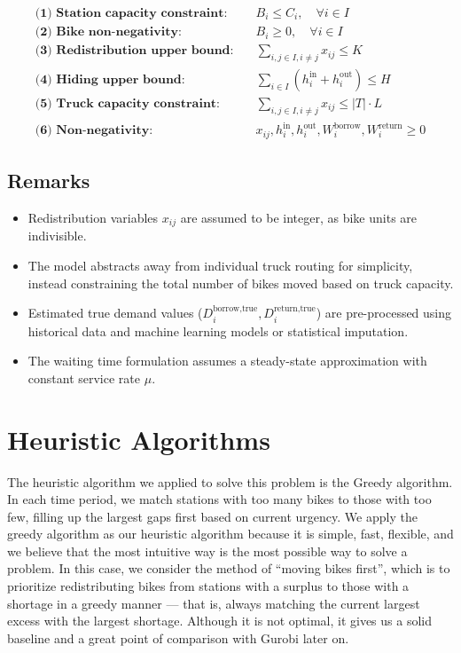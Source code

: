 \documentclass[11pt,a4paper]{article}
\begin{document}
\begin{align*}
\textbf{(1) Station capacity constraint:} & \quad B_i \leq C_i, \quad \forall i \in I \\
\textbf{(2) Bike non-negativity:} & \quad B_i \geq 0, \quad \forall i \in I \\
\textbf{(3) Redistribution upper bound:} & \quad \sum_{i,j \in I, i \ne j} x_{ij} \leq K \\
\textbf{(4) Hiding upper bound:} & \quad \sum_{i \in I} \left(h_i^{\text{in}} + h_i^{\text{out}}\right) \leq H \\
\textbf{(5) Truck capacity constraint:} & \quad \sum_{i,j \in I, i \ne j} x_{ij} \leq |T| \cdot L \\
\textbf{(6) Non-negativity:} & \quad x_{ij}, h_i^{\text{in}}, h_i^{\text{out}}, W_i^{\text{borrow}}, W_i^{\text{return}} \geq 0
\end{align*}

\subsection*{Remarks}

\begin{itemize}
    \item Redistribution variables $x_{ij}$ are assumed to be integer, as bike units are indivisible.
    \item The model abstracts away from individual truck routing for simplicity, instead constraining the total number of bikes moved based on truck capacity.
    \item Estimated true demand values ($D_i^{\text{borrow,true}}, D_i^{\text{return,true}}$) are pre-processed using historical data and machine learning models or statistical imputation.
    \item The waiting time formulation assumes a steady-state approximation with constant service rate $\mu$.
\end{itemize}




\section{Heuristic Algorithms}

The heuristic algorithm we applied to solve this problem is the Greedy algorithm. In each time period, we match stations with too many bikes to those with too few, filling up the largest gaps first based on current urgency.
We apply the greedy algorithm as our heuristic algorithm because it is simple, fast, flexible, and we believe that the most intuitive way is the most possible way to solve a problem. 
In this case, we consider the method of “moving bikes first”, which is to prioritize redistributing bikes from stations with a surplus to those with a shortage in a greedy manner — that is, always matching the current largest excess with the largest shortage.
Although it is not optimal, it gives us a solid baseline and a great point of comparison with Gurobi later on.
\end{document}
